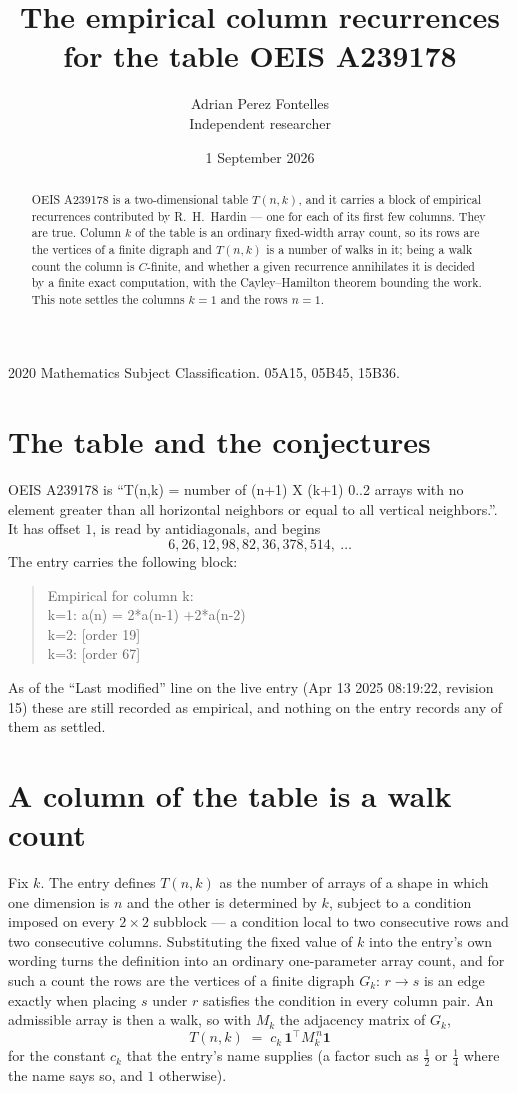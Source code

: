 \documentclass[11pt,a4paper]{article}
\title{The empirical column recurrences for the table OEIS A239178}
\author{Adrian Perez Fontelles\\ \small Independent researcher}
\date{1 September 2026}
\theoremstyle{plain}
\theoremstyle{definition}
\begin{document}
\maketitle

\begin{abstract}
OEIS A239178 is a two-dimensional table $T(n,k)$, and it carries a block of empirical
recurrences contributed by R.~H.~Hardin --- one for each of its first few columns. They are
true. Column $k$ of the table is an ordinary fixed-width array count, so its rows are the
vertices of a finite digraph and $T(n,k)$ is a number of walks in it; being a walk count the
column is $C$-finite, and whether a given recurrence annihilates it is decided by a finite
exact computation, with the Cayley--Hamilton theorem bounding the work. This note settles the columns $k=1$ and the rows $n=1$.
\end{abstract}

\noindent\small 2020 Mathematics Subject Classification. 05A15, 05B45, 15B36.\normalsize

\section{The table and the conjectures}

OEIS A239178 is ``T(n,k) = number of (n+1) X (k+1) 0..2 arrays with no element greater than all horizontal neighbors or equal to all vertical neighbors.''. It has offset $1$, is
read by antidiagonals, and begins
\[
6, 26, 12, 98, 82, 36, 378, 514,\ \dots
\]
The entry carries the following block:
\begin{quote}\small
Empirical for column k:\\
k=1: a(n) = 2*a(n-1) +2*a(n-2)\\
k=2: [order 19]\\
k=3: [order 67]\\
\end{quote}
As of the ``Last modified'' line on the live entry (Apr 13 2025 08:19:22, revision 15) these are still
recorded as empirical, and nothing on the entry records any of them as settled.

\section{A column of the table is a walk count}

Fix $k$. The entry defines $T(n,k)$ as the number of arrays of a shape in which one dimension
is $n$ and the other is determined by $k$, subject to a condition imposed on every
$2\times2$ subblock --- a condition local to two consecutive rows and two consecutive columns.
Substituting the fixed value of $k$ into the entry's own wording turns the definition into an
ordinary one-parameter array count, and for such a count the rows are the vertices of a finite
digraph $G_k$: $r\to s$ is an edge exactly when placing $s$ under $r$ satisfies the condition
in every column pair. An admissible array is then a walk, so with $M_k$ the adjacency matrix
of $G_k$,
\[
T(n,k)\;=\;c_k\,\mathbf{1}^{\!\top}M_k^{\,n}\mathbf{1}
\]
for the constant $c_k$ that the entry's name supplies (a factor such as $\tfrac12$ or
$\tfrac14$ where the name says so, and $1$ otherwise).
\end{document}
